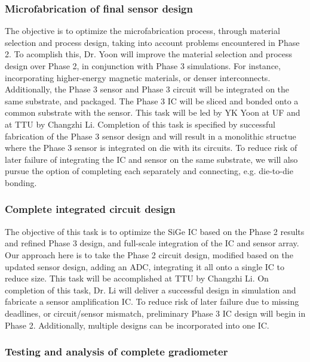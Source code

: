 \subsubsection{Microfabrication of final sensor design}\label{sec:p3:mf}

The objective is to optimize the microfabrication process, through material selection and process design, taking into account problems encountered in Phase 2. To acomplish this, Dr. Yoon will improve the material selection and process design over Phase 2, in conjunction with Phase 3 simulations. For instance, incorporating higher-energy magnetic materials, or denser interconnects. Additionally, the Phase 3 sensor and Phase 3 circuit will be integrated on the same substrate, and packaged. The Phase 3 IC will be sliced and bonded onto a common substrate with the sensor.  This task will be led by YK Yoon at UF and at TTU by Changzhi Li. Completion of this task is specified by successful fabrication of the Phase 3 sensor design and will result in a monolithic structue where the Phase 3 sensor is integrated on die with its circuits. To reduce risk of later failure of integrating the IC and sensor on the same substrate, we will also pursue the option of completing each separately and connecting, e.g. die-to-die bonding.

\subsubsection{Complete integrated circuit design}\label{sec:p3:cir}

The objective of this task is to optimize the SiGe IC based on the Phase 2 results and refined Phase 3 design, and full-scale integration of the IC and sensor array. Our approach here is to take the Phase 2 circuit design, modified based on the updated sensor design, adding an ADC, integrating it all onto a single IC to reduce size. This task will be accomplished at TTU by Changzhi Li. On completion of this task, Dr. Li will deliver a successful design in simulation and fabricate a sensor amplification IC. To reduce risk of later failure due to missing deadlines, or circuit/sensor mismatch, preliminary Phase 3 IC design will begin in Phase 2. Additionally, multiple designs can be incorporated into one IC.

\subsubsection{Testing and analysis of complete gradiometer}\label{sec:p3:test}

